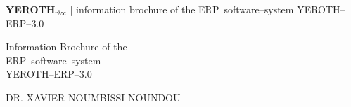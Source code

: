 \documentclass[a4paper, 10pt]{article}
\newcommand{\erpsoftwaresystem}{ERP~software--system\xspace}
\newcommand{\yerothrc}{\textcolor{yerothColorGreen}
			{\textsc{\textcolor{yerothColorRed}{YEROTH}}$_{\text{r\&c}}$\xspace}}
\newcommand{\yerotherpblack}{YEROTH--ERP--$3.0$\xspace}
\newcommand{\myfullacademicname}{DR. XAVIER NOUMBISSI NOUNDOU\xspace}
\begin{document}
\thispagestyle{OnlyFirstPage}

{\bf \LARGE \yerothrc} {| \sc \scriptsize information brochure of the \erpsoftwaresystem \yerotherpblack}

\vspace{2.0em}

\begin{center}
{\LARGE Information Brochure of the \\
    \vspace{0.3em}
    \erpsoftwaresystem \\
    \vspace{0.5em}
    \yerotherpblack}
\end{center}

\vspace{2.0em}

\begin{center}
{\large \myfullacademicname}
\end{center}

\vspace{1.0em}
\end{document}
